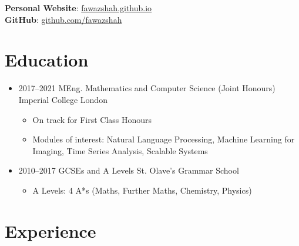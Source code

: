 \documentclass[11pt,a4paper,sans]{moderncv}        %
\begin{document}
\maketitle

\vspace{-40pt}

\begin{center}
\textbf{Personal Website}: \href{https://fawazshah.github.io/}{fawazshah.github.io} \\
\textbf{GitHub}: \href{https://github.com/fawazshah/}{github.com/fawazshah}
\end{center}

\section{Education}

\begin{itemize}

\item{
\cventry
{2017--2021}
{MEng. Mathematics and Computer Science (Joint Honours)}
{Imperial College London}
{}{}{
\begin{itemize}
\item On track for First Class Honours
\item Modules of interest: Natural Language Processing, Machine Learning for Imaging, Time Series Analysis, Scalable Systems
\end{itemize}
}} %

\item{
\cventry
{2010--2017}
{GCSEs and A Levels}
{St. Olave's Grammar School}
{}{}{
\begin{itemize}
\item A Levels: 4 A*s (Maths, Further Maths, Chemistry, Physics)
\end{itemize}
}}

\end{itemize}

\vspace{-10pt}

\section{Experience}
\end{document}
